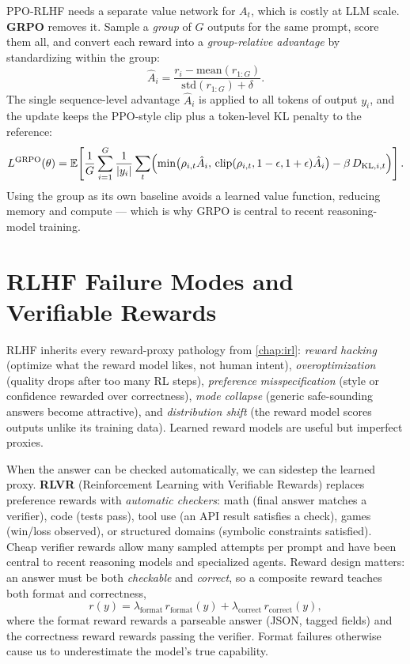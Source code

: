 \documentclass[11pt, oneside]{book}
\newcommand{\E}{\mathbb{E}}              %
\newcommand{\abs}[1]{\left\lvert #1 \right\rvert}
\begin{document}
PPO-RLHF needs a separate value network for $A_t$, which is costly at LLM scale.
\textbf{GRPO} removes it. Sample a \emph{group} of $G$ outputs for the same prompt, score
them all, and convert each reward into a \emph{group-relative advantage} by standardizing
within the group:
\[
  \hat A_i = \frac{r_i - \mathrm{mean}(r_{1:G})}{\mathrm{std}(r_{1:G}) + \delta}.
\]
The single sequence-level advantage $\hat A_i$ is applied to all tokens of output $y_i$, and
the update keeps the PPO-style clip plus a token-level KL penalty to the reference:
\[
  L^{\text{GRPO}}(\theta) = \E\!\left[\frac{1}{G}\sum_{i=1}^G \frac{1}{\abs{y_i}}
    \sum_t \Bigl(\min\bigl(\rho_{i,t}\hat A_i,\, \mathrm{clip}(\rho_{i,t}, 1-\epsilon, 1+\epsilon)\hat A_i\bigr)
    - \beta\, D_{\mathrm{KL},i,t}\Bigr)\right].
\]
Using the group as its own baseline avoids a learned value function, reducing memory and
compute --- which is why GRPO is central to recent reasoning-model training.

\section{RLHF Failure Modes and Verifiable Rewards}

RLHF inherits every reward-proxy pathology from \cref{chap:irl}: \emph{reward hacking}
(optimize what the reward model likes, not human intent), \emph{overoptimization} (quality
drops after too many RL steps), \emph{preference misspecification} (style or confidence
rewarded over correctness), \emph{mode collapse} (generic safe-sounding answers become
attractive), and \emph{distribution shift} (the reward model scores outputs unlike its
training data). Learned reward models are useful but imperfect proxies.

When the answer can be checked automatically, we can sidestep the learned proxy.
\textbf{RLVR} (Reinforcement Learning with Verifiable Rewards) replaces preference rewards
with \emph{automatic checkers}: math (final answer matches a verifier), code (tests pass),
tool use (an API result satisfies a check), games (win/loss observed), or structured domains
(symbolic constraints satisfied). Cheap verifier rewards allow many sampled attempts per
prompt and have been central to recent reasoning models and specialized agents. Reward
design matters: an answer must be both \emph{checkable} and \emph{correct}, so a composite
reward teaches both format and correctness,
\[
  r(y) = \lambda_{\text{format}}\, r_{\text{format}}(y) + \lambda_{\text{correct}}\, r_{\text{correct}}(y),
\]
where the format reward rewards a parseable answer (JSON, tagged fields) and the correctness
reward rewards passing the verifier. Format failures otherwise cause us to underestimate the
model's true capability.
\end{document}
